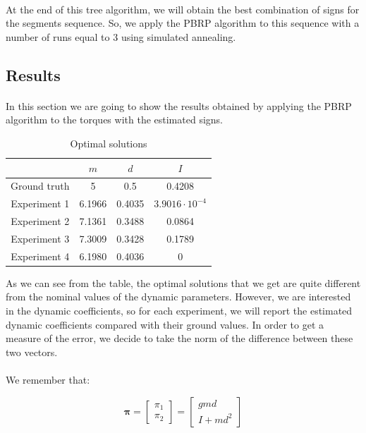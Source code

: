 \documentclass{article}
\begin{document}
\paragraph{}At the end of this tree algorithm, we will obtain the best combination of signs for the segments sequence. So, we apply the PBRP algorithm to this sequence with a number of runs equal to 3 using simulated annealing.

\subsection{Results}
\paragraph{}In this section we are going to show the results obtained by applying the PBRP algorithm to the torques with the estimated signs.

\begin{table}[!htbp]
\centering
\begin{tabular}{|c|ccc|}
\hline
& $m$ & $d$ & $I$\\
\hline
Ground truth & 5 & 0.5 & 0.4208\\
Experiment 1 & 6.1966 & 0.4035 & $3.9016\cdot 10^{-4}$\\
Experiment 2 & 7.1361 & 0.3488 & 0.0864\\
Experiment 3 & 7.3009 & 0.3428 & 0.1789\\
Experiment 4 & 6.1980 & 0.4036 & 0\\
\hline
\end{tabular}
\caption{Optimal solutions}
\end{table}

As we can see from the table, the optimal solutions that we get are quite different from the nominal values of the dynamic parameters. However, we are interested in the dynamic coefficients, so for each experiment, we will report the estimated dynamic coefficients compared with their ground values. In order to get a measure of the error, we decide to take the norm of the difference between these two vectors.

\paragraph{}We remember that:

\[\bm{\pi}= \begin{bmatrix}
\pi_1 \\ \pi_2
\end{bmatrix} = \begin{bmatrix}
gmd \\ I +md^2
\end{bmatrix}\]
\end{document}
